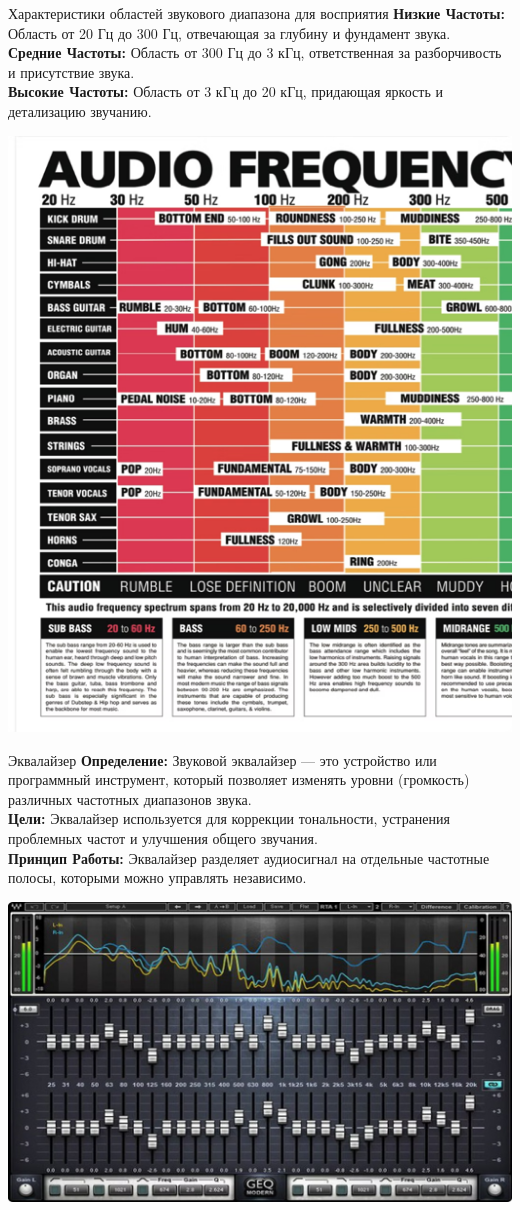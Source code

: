 \documentclass{beamer}
\begin{document}
\begin{frame}{Характеристики областей звукового диапазона для восприятия}
    \textbf{Низкие Частоты: } Область от 20 Гц до 300 Гц, отвечающая за глубину и фундамент звука. \\
    \vspace{0.3cm}
    \textbf{Средние Частоты: } Область от 300 Гц до 3 кГц, ответственная за разборчивость и присутствие звука. \\
    \vspace{0.3cm}
    \textbf{Высокие Частоты: } Область от 3 кГц до 20 кГц, придающая яркость и детализацию звучанию.
    \begin{center}
        \includegraphics[width=0.6\linewidth]{pic3.png} %
    \end{center}
\end{frame}

\begin{frame}{Эквалайзер}
    \textbf{Определение: } Звуковой эквалайзер — это устройство или программный инструмент, который позволяет изменять уровни (громкость) различных частотных диапазонов звука. \\
    \vspace{0.3cm}
    \textbf{Цели: } Эквалайзер используется для коррекции тональности, устранения проблемных частот и улучшения общего звучания. \\
    \vspace{0.3cm}
    \textbf{Принцип Работы: } Эквалайзер разделяет аудиосигнал на отдельные частотные полосы, которыми можно управлять независимо.
    \begin{center}
        \includegraphics[width=0.6\linewidth]{pic4.png} %
    \end{center}
\end{frame}
\end{document}
